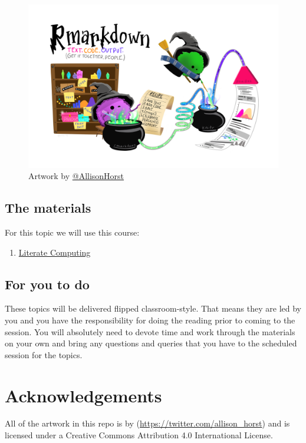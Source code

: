 \documentclass[
]{book}
\providecommand{\tightlist}{%
  \setlength{\itemsep}{0pt}\setlength{\parskip}{0pt}}
\begin{document}
\begin{figure}
\centering
\includegraphics{rmarkdown_wizards.png}
\caption{\label{fig:unnamed-chunk-7}Artwork by \href{https://github.com/allisonhorst}{@AllisonHorst}}
\end{figure}

\hypertarget{the-materials-6}{%
\section{The materials}\label{the-materials-6}}

For this topic we will use this course:

\begin{enumerate}
\def\labelenumi{\arabic{enumi}.}
\tightlist
\item
  \href{https://danmaclean.github.io/literate_computing/}{Literate Computing}
\end{enumerate}

\hypertarget{for-you-to-do-6}{%
\section{For you to do}\label{for-you-to-do-6}}

These topics will be delivered flipped classroom-style. That means they are led by you and you have the responsibility for doing the reading prior to coming to the session. You will absolutely need to devote time and work through the materials on your own and bring any questions and queries that you have to the scheduled session for the topics.

\hypertarget{acknowledgements}{%
\chapter{Acknowledgements}\label{acknowledgements}}

All of the artwork in this repo is by \citep[\textbackslash{}][]{allison_horst}(\url{https://twitter.com/allison_horst}) and is licensed under a Creative Commons Attribution 4.0 International License.

  
\end{document}
